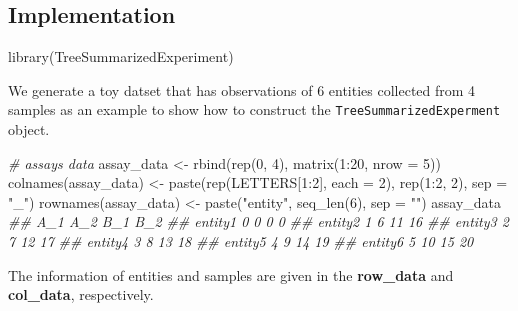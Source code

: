\documentclass[]{article}
\newcommand{\hlnum}[1]{\textcolor[rgb]{0.816,0.125,0.439}{#1}}%
\newcommand{\hlstr}[1]{\textcolor[rgb]{0.251,0.627,0.251}{#1}}%
\newcommand{\hlcom}[1]{\textcolor[rgb]{0.502,0.502,0.502}{\textit{#1}}}%
\newcommand{\hlopt}[1]{\textcolor[rgb]{0,0,0}{#1}}%
\newcommand{\hlstd}[1]{\textcolor[rgb]{0.251,0.251,0.251}{#1}}%
\newcommand{\hlkwc}[1]{\textcolor[rgb]{0.251,0.251,0.251}{#1}}%
\newcommand{\hlkwd}[1]{\textcolor[rgb]{0.878,0.439,0.125}{#1}}%
\newenvironment{Shaded}{\begin{myshaded}}{\end{myshaded}}
\newcommand{\KeywordTok}[1]{\hlkwd{#1}}
\newcommand{\DataTypeTok}[1]{\hlkwc{#1}}
\newcommand{\DecValTok}[1]{\hlnum{#1}}
\newcommand{\StringTok}[1]{\hlstr{#1}}
\newcommand{\CommentTok}[1]{\hlcom{#1}}
\newcommand{\OperatorTok}[1]{\hlopt{#1}}
\newcommand{\NormalTok}[1]{\hlstd{#1}}
\begin{document}
\hypertarget{implementation}{%
\subsection{Implementation}\label{implementation}}

\begin{Shaded}
\begin{Highlighting}[]
\KeywordTok{library}\NormalTok{(TreeSummarizedExperiment)}
\end{Highlighting}
\end{Shaded}

We generate a toy datset that has observations of 6 entities collected from 4
samples as an example to show how to construct the \texttt{TreeSummarizedExperment} object.

\begin{Shaded}
\begin{Highlighting}[]
\CommentTok{# assays data}
\NormalTok{assay_data <-}\StringTok{ }\KeywordTok{rbind}\NormalTok{(}\KeywordTok{rep}\NormalTok{(}\DecValTok{0}\NormalTok{, }\DecValTok{4}\NormalTok{), }\KeywordTok{matrix}\NormalTok{(}\DecValTok{1}\OperatorTok{:}\DecValTok{20}\NormalTok{, }\DataTypeTok{nrow =} \DecValTok{5}\NormalTok{))}
\KeywordTok{colnames}\NormalTok{(assay_data) <-}\StringTok{ }\KeywordTok{paste}\NormalTok{(}\KeywordTok{rep}\NormalTok{(LETTERS[}\DecValTok{1}\OperatorTok{:}\DecValTok{2}\NormalTok{], }\DataTypeTok{each =} \DecValTok{2}\NormalTok{), }
                            \KeywordTok{rep}\NormalTok{(}\DecValTok{1}\OperatorTok{:}\DecValTok{2}\NormalTok{, }\DecValTok{2}\NormalTok{), }\DataTypeTok{sep =} \StringTok{"_"}\NormalTok{)}
\KeywordTok{rownames}\NormalTok{(assay_data) <-}\StringTok{ }\KeywordTok{paste}\NormalTok{(}\StringTok{"entity"}\NormalTok{, }\KeywordTok{seq_len}\NormalTok{(}\DecValTok{6}\NormalTok{), }\DataTypeTok{sep =} \StringTok{""}\NormalTok{)}
\NormalTok{assay_data}
\CommentTok{##         A_1 A_2 B_1 B_2}
\CommentTok{## entity1   0   0   0   0}
\CommentTok{## entity2   1   6  11  16}
\CommentTok{## entity3   2   7  12  17}
\CommentTok{## entity4   3   8  13  18}
\CommentTok{## entity5   4   9  14  19}
\CommentTok{## entity6   5  10  15  20}
\end{Highlighting}
\end{Shaded}

The information of entities and samples are given in the \textbf{row\_data} and \textbf{col\_data}, respectively.
\end{document}
